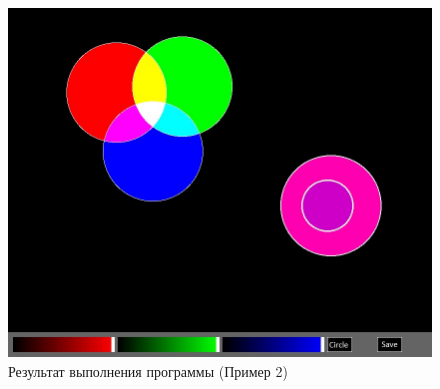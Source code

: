 \documentclass[14pt, a4paper]{extreport}
\begin{document}
\begin{figure}[h!]
	\centering
	\includegraphics[width = 12cm]{image/image_2}
  \caption{Результат выполнения программы (Пример 2)}
\end{figure}

\end{document}
